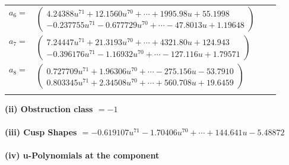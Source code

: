 \documentclass[1p]{elsarticle_modified}
\theoremstyle{definition}
\begin{document}
\begin{tabular}{m{7pt} m{180pt} m{7pt} m{180pt} }
\flushright $a_{6}=$&$\begin{pmatrix}4.24388 u^{71}+12.1560 u^{70}+\cdots+1995.98 u+55.1998\\-0.237755 u^{71}-0.677729 u^{70}+\cdots-47.8013 u+1.19648\end{pmatrix}$ \\
\flushright $a_{7}=$&$\begin{pmatrix}7.24447 u^{71}+21.3193 u^{70}+\cdots+4321.80 u+124.943\\-0.396176 u^{71}-1.16932 u^{70}+\cdots-127.116 u+1.79571\end{pmatrix}$ \\
\flushright $a_{8}=$&$\begin{pmatrix}0.727709 u^{71}+1.96306 u^{70}+\cdots-275.156 u-53.7910\\0.803345 u^{71}+2.34508 u^{70}+\cdots+560.708 u+19.6459\end{pmatrix}$\\&\end{tabular}
\flushleft \textbf{(ii) Obstruction class $= -1$}\\~\\
\flushleft \textbf{(iii) Cusp Shapes $= -0.619107 u^{71}-1.70406 u^{70}+\cdots+144.641 u-5.48872$}\\~\\
\newpage\renewcommand{\arraystretch}{1}
\flushleft \textbf{(iv) u-Polynomials at the component}\newline \\
\end{document}
